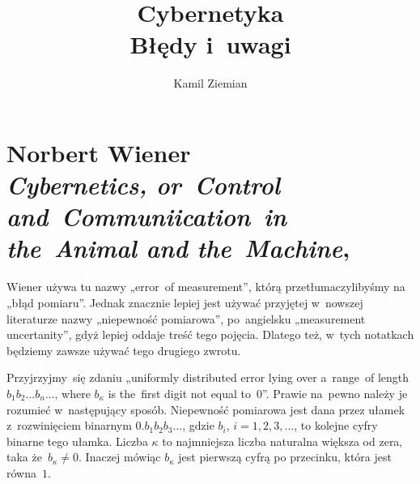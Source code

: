 \documentclass[a4paper,11pt]{article}
\title{Cybernetyka \\
  {\Large Błędy i~uwagi}}
\author{Kamil Ziemian}
\numberwithin{equation}{section}
\begin{document}





\maketitle %





\section{Norbert Wiener \\
  \textit{Cybernetics, or~Control and~Communiication~in \\
    the~Animal and the~Machine},
  \parencite{Wiener-Cybernetics-Second-edition-Pub-2016}}

\vspace{0em}



\vspace{0em}


\noindent
{}

\VerSpaceFour






\vspace{0em}


\noindent
{} Wiener używa tu nazwy „error~of measurement”, którą
przetłumaczylibyśmy na „błąd pomiaru”. Jednak znacznie lepiej jest
używać przyjętej w~nowszej literaturze nazwy „niepewność pomiarowa”,
po~angielsku „measurement uncertanity”, gdyż lepiej oddaje treść tego
pojęcia. Dlatego też, w~tych notatkach będziemy zawsze używać tego drugiego
zwrotu.

\VerSpaceFour





\noindent
{} Przyjrzyjmy~się zdaniu „uniformly distributed
error lying over a~range~of length $b_{ 1 } b_{ 2 } \ldots b_{ n }\ldots$, where
$b_{ \kappa }$ is the~first digit not equal to~$0$”. Prawie na~pewno należy je
rozumieć w~następujący sposób. Niepewność pomiarowa jest dana przez ułamek
z~rozwinięciem binarnym $0.b_{ 1 } b_{ 2 } b_{ 3 }\ldots$, gdzie $b_{ i }$,
$i = 1, 2, 3, \ldots$, to kolejne cyfry binarne tego ułamka. Liczba $\kappa$ to
najmniejsza liczba naturalna większa od zera, taka że~$b_{ \kappa } \neq 0$.
Inaczej mówiąc $b_{ \kappa }$ jest pierwszą cyfrą po przecinku, która jest
równa~$1$.
\end{document}
